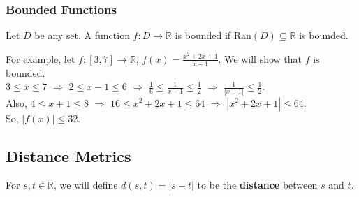 \documentclass[10pt]{extarticle}
\newcommand{\ran}{\text{Ran}}
\newcommand{\R}{\mathbb{R}}
\begin{document}
    \subsubsection{Bounded Functions}%
      Let $D$ be any set. A function $f: D\rightarrow \R$ is bounded if $\ran(D)\subseteq \R$ is bounded.
    
      For example, let $f: [3,7] \rightarrow \R$, $f(x) = \frac{x^2 + 2x + 1}{x-1}$. We will show that $f$ is bounded.\\

      $3\leq x \leq 7$ $\Rightarrow$ $2 \leq x-1 \leq 6$ $\Rightarrow$ $\frac{1}{6} \leq \frac{1}{x-1} \leq \frac{1}{2}$ $\Rightarrow$ $\frac{1}{|x-1|} \leq \frac{1}{2}$.\\

      Also, $4 \leq x+1 \leq 8$ $\Rightarrow$ $16 \leq x^2 + 2x + 1 \leq 64$ $\Rightarrow$ $|x^2 + 2x + 1| \leq 64$.\\

      So, $|f(x)| \leq 32$.
  \subsection{Distance Metrics}%
    For $s,t\in\R$, we will define $d(s,t) = |s-t|$ to be the \textbf{distance} between $s$ and $t$.
\end{document}
